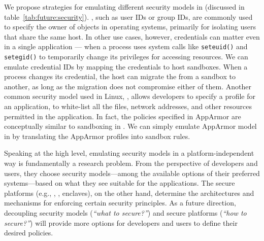 We propose strategies for emulating different security models in \liboses{}  (discussed in table~\ref{tab:future:security}).
, such as user IDs or group IDs,
are commonly used to specify the owner of objects in operating systems,
primarily for
isolating users that share the same  host.
In other use cases, however, credentials can matter even in a single application
--- when a process uses system calls like {\tt seteuid()} and {\tt setegid()}
to temporarily change its privileges for accessing resources.
We can emulate credential IDs by mapping the credentials to host sandboxes.
When a process changes its credential,
the host can migrate the \picoproc{} from a sandbox to another,
as long as the migration
does not compromise either of them.
Another common security model used in Linux, , 
allows developers to specify a profile for an application,
to white-list
all the files, network addresses, and other resources
permitted in the application.
In fact, the policies specified in AppArmor are conceptually similar
to sandboxing in \graphene{}.
We can simply emulate AppArmor model in \graphene{} by translating the AppArmor profiles into sandbox rules.

Speaking at the high level,
emulating security models in a platform-independent way
is fundamentally a research problem. 
From the perspective of developers and users,
they choose security models---among the available options of their preferred systems---based on what they see suitable for
the applications.
The secure platforms (e.g., \liboses{}, \microkernel{}, \sgx{} enclaves), on the other hand,
determine the architectures and mechanisms for
enforcing certain security principles.
As a future direction,
decoupling security models (\emph{``what to secure?''}) and secure platforms (\emph{``how to secure?''})
will provide more options
for developers and users to define their desired policies.









%

